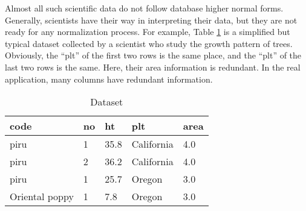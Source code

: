 \documentclass[conference]{IEEEtran}
\begin{document}
Almost all such scientific data do not follow database higher normal
forms. Generally, scientists have their way in interpreting their
data, but they are not ready for any normalization process. 
For example, Table \ref{tb:dataset} is a simplified but typical dataset collected by
a scientist who study the growth pattern of trees. 
Obviously, the ``plt'' of the first two rows is the same place, and
the ``plt'' of the last two rows is the same. 
Here, their area information is redundant. 
In the real application, many columns have redundant information. 



\begin{table}[htb]
\begin{center}
\begin{tabular}{|l|l|l|l|l|}
\hline
code & no & ht & plt & area\\\hline
piru & 1 & 35.8 & California & 4.0\\\hline
piru & 2 & 36.2 & California & 4.0\\\hline
piru & 1 & 25.7 & Oregon & 3.0 \\\hline
Oriental poppy& 1 & 7.8 & Oregon & 3.0\\\hline 
\end{tabular}
\end{center}
\caption{Dataset}
\label{tb:dataset}
\end{table}
\end{document}
